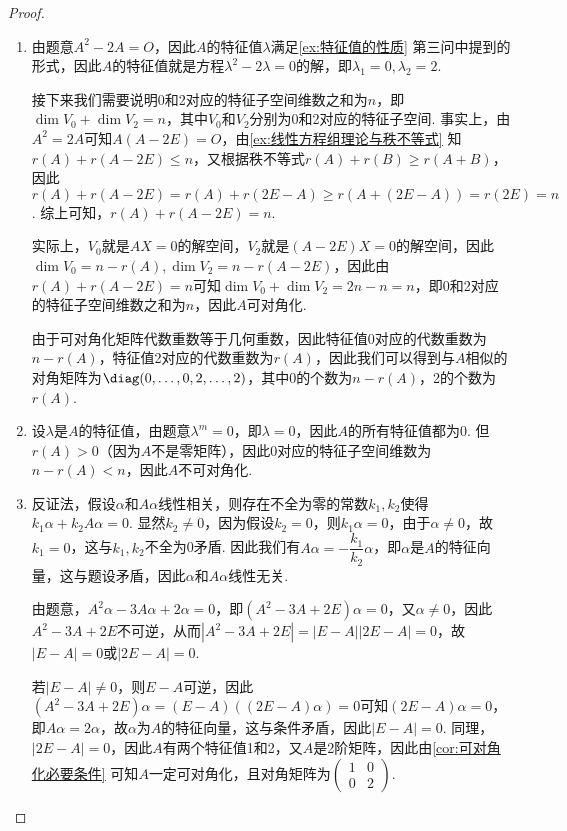 \begin{proof}
    \begin{enumerate}
        \item 由题意$A^2-2A=O$，因此$A$的特征值$\lambda$满足\autoref{ex:特征值的性质} 第三问中提到的形式，因此$A$的特征值就是方程$\lambda^2-2\lambda=0$的解，即$\lambda_1=0,\lambda_2=2$.

              接下来我们需要说明0和2对应的特征子空间维数之和为$n$，即$\dim V_0+\dim V_2=n$，其中$V_0$和$V_2$分别为0和2对应的特征子空间. 事实上，由$A^2=2A$可知$A(A-2E)=O$，由\autoref{ex:线性方程组理论与秩不等式} 知$r(A)+r(A-2E)\leqslant n$，又根据秩不等式$r(A)+r(B)\geqslant r(A+B)$，因此$r(A)+r(A-2E)=r(A)+r(2E-A)\geqslant r(A+(2E-A))=r(2E)=n$. 综上可知，$r(A)+r(A-2E)=n$.

              实际上，$V_0$就是$AX=0$的解空间，$V_2$就是$(A-2E)X=0$的解空间，因此$\dim V_0=n-r(A),\dim V_2=n-r(A-2E)$，因此由$r(A)+r(A-2E)=n$可知$\dim V_0+\dim V_2=2n-n=n$，即0和2对应的特征子空间维数之和为$n$，因此$A$可对角化.

              由于可对角化矩阵代数重数等于几何重数，因此特征值0对应的代数重数为$n-r(A)$，特征值2对应的代数重数为$r(A)$，因此我们可以得到与$A$相似的对角矩阵为$\diag(0,\ldots,0,2,\ldots,2)$，其中0的个数为$n-r(A)$，2的个数为$r(A)$.

        \item 设$\lambda$是$A$的特征值，由题意$\lambda^m=0$，即$\lambda=0$，因此$A$的所有特征值都为0. 但$r(A)>0$（因为$A$不是零矩阵），因此0对应的特征子空间维数为$n-r(A)<n$，因此$A$不可对角化.

        \item 反证法，假设$\alpha$和$A\alpha$线性相关，则存在不全为零的常数$k_1,k_2$使得$k_1\alpha+k_2A\alpha=0$. 显然$k_2\neq 0$，因为假设$k_2=0$，则$k_1\alpha=0$，由于$\alpha\neq 0$，故$k_1=0$，这与$k_1,k_2$不全为0矛盾. 因此我们有$A\alpha=-\dfrac{k_1}{k_2}\alpha$，即$\alpha$是$A$的特征向量，这与题设矛盾，因此$\alpha$和$A\alpha$线性无关.

              由题意，$A^2\alpha-3A\alpha+2\alpha=0$，即$(A^2-3A+2E)\alpha=0$，又$\alpha\neq 0$，因此$A^2-3A+2E$不可逆，从而$|A^2-3A+2E|=|E-A||2E-A|=0$，故$|E-A|=0$或$|2E-A|=0$.

              若$|E-A|\neq 0$，则$E-A$可逆，因此$(A^2-3A+2E)\alpha=(E-A)((2E-A)\alpha)=0$可知$(2E-A)\alpha=0$，即$A\alpha=2\alpha$，故$\alpha$为$A$的特征向量，这与条件矛盾，因此$|E-A|=0$. 同理，$|2E-A|=0$，因此$A$有两个特征值1和2，又$A$是2阶矩阵，因此由\autoref{cor:可对角化必要条件} 可知$A$一定可对角化，且对角矩阵为$\begin{pmatrix}
                      1 & 0 \\
                      0 & 2
                  \end{pmatrix}$.
    \end{enumerate}
\end{proof}

